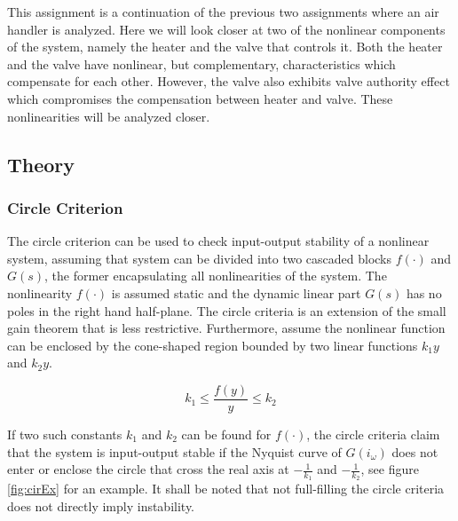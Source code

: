 \documentclass[a4paper, titlepage]{article}
\begin{document}
This assignment is a continuation of the previous two assignments where an air handler is analyzed.
Here we will look closer at two of the nonlinear components of the system, namely the heater and the valve that controls it.
Both the heater and the valve have nonlinear, but complementary, characteristics which compensate for each other.  However, the valve also exhibits valve authority effect which compromises the compensation between heater and valve.  These nonlinearities will be analyzed closer. 
\citep[p.123]{glad00}

\subsection{Theory}

\subsubsection{Circle Criterion}
The circle criterion can be used to check input-output stability of a nonlinear system, assuming that system can be divided into two cascaded blocks $f(\cdot)$ and $G(s)$, the former encapsulating all nonlinearities of the system.
The nonlinearity $f(\cdot)$ is assumed static and the dynamic linear part $G(s)$ has no poles in the right hand half-plane.
The circle criteria is an extension of the small gain theorem that is less restrictive.
Furthermore, assume the nonlinear function can be enclosed by the cone-shaped region bounded by two linear functions $k_1y$ and $k_2y$.

\begin{equation}
k_1 \leq \frac{f(y)}{y} \leq k_2 
\end{equation} 

If two such constants $k_1$ and $k_2$ can be found for $f(\cdot)$, the circle criteria claim that the system is input-output stable if the Nyquist curve of $G(i_\omega)$ does not enter or enclose the circle that cross the real axis at $-\frac{1}{k_1}$ and $-\frac{1}{k_2}$, see figure \ref{fig:cirEx} for an example.
It shall be noted that not full-filling the circle criteria does not directly imply instability. \citep[~p.329-334]{glad00}
\end{document}
